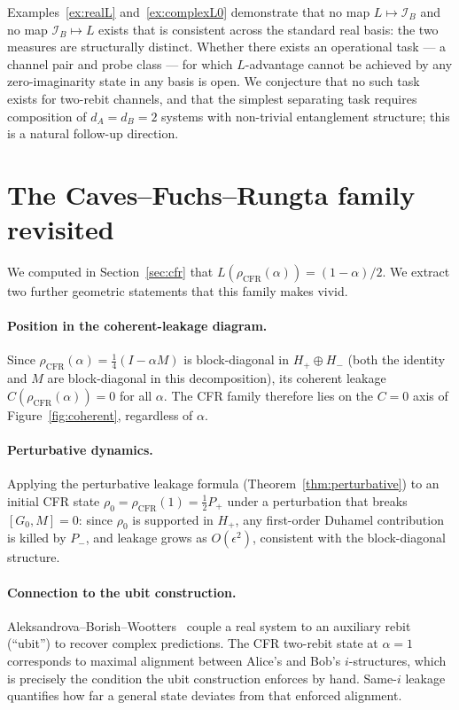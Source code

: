 \documentclass[a4paper,onecolumn,noarxiv]{quantumarticle}
\theoremstyle{plain}
\theoremstyle{definition}
\theoremstyle{remark}
\newcommand{\Pplus}{P_{+}}
\newcommand{\Pminus}{P_{-}}
\newcommand{\Hplus}{H_{+}}
\newcommand{\Hminus}{H_{-}}
\newcommand{\Mop}{M}
\newcommand{\Lleak}{L}
\begin{document}
Examples~\ref{ex:realL} and~\ref{ex:complexL0} demonstrate that no map
$\Lleak\mapsto\mathcal{I}_B$ and no map $\mathcal{I}_B\mapsto\Lleak$ exists that is
consistent across the standard real basis: the two measures are structurally distinct.
Whether there exists an operational task --- a channel pair and probe class --- for
which $\Lleak$-advantage cannot be achieved by any zero-imaginarity state in any basis
is open. We conjecture that no such task exists for two-rebit channels, and that the
simplest separating task requires composition of $d_A=d_B=2$ systems with
non-trivial entanglement structure; this is a natural follow-up direction.

\section{The Caves--Fuchs--Rungta family revisited}
\label{sec:cfr-revisit}

We computed in Section~\ref{sec:cfr} that $\Lleak(\rho_{\mathrm{CFR}}(\alpha))=(1-\alpha)/2$.
We extract two further geometric statements that this family makes vivid.

\paragraph{Position in the coherent-leakage diagram.} Since
$\rho_{\mathrm{CFR}}(\alpha)=\tfrac{1}{4}(I-\alpha\Mop)$ is block-diagonal in
$\Hplus\oplus\Hminus$ (both the identity and $\Mop$ are block-diagonal in this
decomposition), its coherent leakage $C(\rho_{\mathrm{CFR}}(\alpha))=0$ for all
$\alpha$. The CFR family therefore lies on the $C=0$ axis of Figure~\ref{fig:coherent},
regardless of $\alpha$.

\paragraph{Perturbative dynamics.} Applying the perturbative leakage formula
(Theorem~\ref{thm:perturbative}) to an initial CFR state $\rho_0=\rho_{\mathrm{CFR}}(1)
=\tfrac{1}{2}\Pplus$ under a perturbation that breaks $[G_0,\Mop]=0$: since
$\rho_0$ is supported in $\Hplus$, any first-order Duhamel contribution is killed by
$\Pminus$, and leakage grows as $O(\epsilon^2)$, consistent with the block-diagonal
structure.

\paragraph{Connection to the ubit construction.} Aleksandrova--Borish--Wootters~%
\cite{AleksandrovaBorishWootters2013} couple a real system to an auxiliary rebit
(``ubit'') to recover complex predictions. The CFR two-rebit state at $\alpha=1$
corresponds to maximal alignment between Alice's and Bob's $i$-structures, which is
precisely the condition the ubit construction enforces by hand. Same-$i$ leakage
quantifies how far a general state deviates from that enforced alignment.
\end{document}
